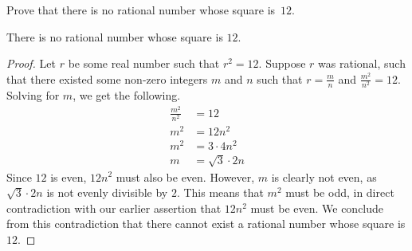 \begin{exercise}
	Prove that there is no rational number whose square is~$12$.
\end{exercise}
\begin{proposition}
	There is no rational number whose square is $12$.
\end{proposition}
\begin{proof}
	Let $r$ be some real number such that $r^2 = 12$. Suppose $r$ was rational, such that there existed some non-zero integers $m$ and $n$ such that $r = \frac{m}{n}$ and $\frac{m^2}{n^2} = 12$. Solving for $m$, we get the following.
	\begin{align*}
	\frac{m^2}{n^2} &= 12 \\
	m^2 &= 12n^2 \\
	m^2 &= 3 \cdot 4n^2 \\
	m &= \sqrt{3} \cdot 2n
	\end{align*}
	Since $12$ is even, $12n^2$ must also be even. However, $m$ is clearly not even, as $\sqrt{3} \cdot 2n$ is not evenly divisible by $2$. This means that $m^2$ must be odd, in direct contradiction with our earlier assertion that $12n^2$ must be even. We conclude from this contradiction that there cannot exist a rational number whose square is $12$.
\end{proof}
